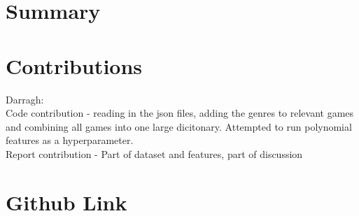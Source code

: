 \section{Summary}

\section{Contributions}

Darragh: \\Code contribution - reading in the json files, adding the genres to relevant games and combining all games into one large dicitonary. Attempted to run polynomial features as a hyperparameter.\\ Report contribution - Part of dataset and features, part of discussion



\section{Github Link}